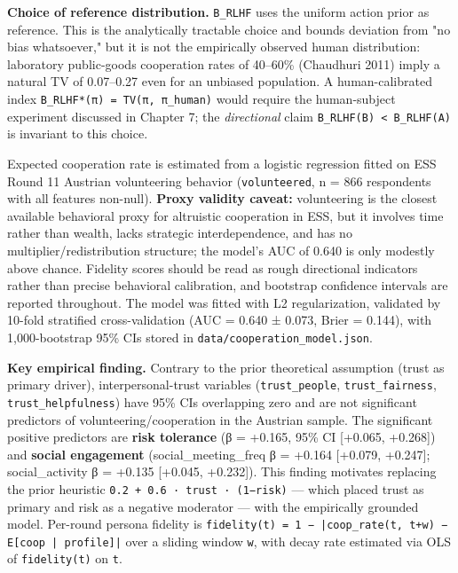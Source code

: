 \textbf{Choice of reference distribution.} \texttt{B\_RLHF} uses the uniform action prior as reference. This is the analytically tractable choice and bounds deviation from "no bias whatsoever," but it is not the empirically observed human distribution: laboratory public-goods cooperation rates of 40–60\% (Chaudhuri 2011) imply a natural TV of 0.07–0.27 even for an unbiased population. A human-calibrated index \texttt{B\_RLHF*(π) = TV(π, π\_human)} would require the human-subject experiment discussed in Chapter 7; the \textit{directional} claim \texttt{B\_RLHF(B) < B\_RLHF(A)} is invariant to this choice.


Expected cooperation rate is estimated from a logistic regression fitted on ESS Round 11 Austrian volunteering behavior (\texttt{volunteered}, n = 866 respondents with all features non-null). \textbf{Proxy validity caveat:} volunteering is the closest available behavioral proxy for altruistic cooperation in ESS, but it involves time rather than wealth, lacks strategic interdependence, and has no multiplier/redistribution structure; the model's AUC of 0.640 is only modestly above chance. Fidelity scores should be read as rough directional indicators rather than precise behavioral calibration, and bootstrap confidence intervals are reported throughout. The model was fitted with L2 regularization, validated by 10-fold stratified cross-validation (AUC = 0.640 ± 0.073, Brier = 0.144), with 1,000-bootstrap 95\% CIs stored in \texttt{data/cooperation\_model.json}.

\textbf{Key empirical finding.} Contrary to the prior theoretical assumption (trust as primary driver), interpersonal-trust variables (\texttt{trust\_people}, \texttt{trust\_fairness}, \texttt{trust\_helpfulness}) have 95\% CIs overlapping zero and are not significant predictors of volunteering/cooperation in the Austrian sample. The significant positive predictors are \textbf{risk tolerance} (β = +0.165, 95\% CI [+0.065, +0.268]) and \textbf{social engagement} (social\_meeting\_freq β = +0.164 [+0.079, +0.247]; social\_activity β = +0.135 [+0.045, +0.232]). This finding motivates replacing the prior heuristic \texttt{0.2 + 0.6 · trust · (1−risk)} — which placed trust as primary and risk as a negative moderator — with the empirically grounded model. Per-round persona fidelity is \texttt{fidelity(t) = 1 − |coop\_rate(t, t+w) − E[coop | profile]|} over a sliding window \texttt{w}, with decay rate estimated via OLS of \texttt{fidelity(t)} on \texttt{t}.

